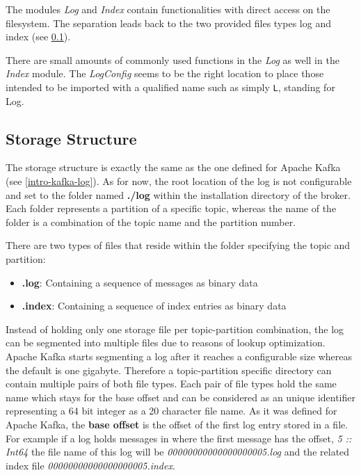 The modules \textit{Log} and \textit{Index} contain functionalities with direct
access on the filesystem. The separation leads back to the two provided files types
log and index (see \ref{log-broker-storage}).

There are small amounts of commonly used functions in the \textit{Log} as well
in the \textit{Index} module. The \textit{LogConfig} seems to be the right
location to place those intended to be imported with a qualified name such as
simply \lstinline{L}, standing for Log.

\subsection{Storage Structure}
\label{log-broker-storage}

The storage structure is exactly the same as the one defined for Apache Kafka (see
\ref{intro-kafka-log}).  As for now, the root location of the log is not
configurable and set to the folder named \textbf{./log} within the installation
directory of the broker. Each folder represents a partition of a specific topic,
whereas the name of the folder is a combination of the topic name and the
partition number.

There are two types of files that reside within the folder specifying the
topic and partition:
\begin{itemize}
    \item {\bf .log}: Containing a sequence of messages as binary data
    \item{\bf .index}: Containing a sequence of index entries as binary data
\end{itemize}

Instead of holding only one storage file per topic-partition combination, the
log can be segmented into multiple files due to reasons of lookup optimization.
Apache Kafka starts segmenting a log after it reaches a configurable size
whereas the default is one gigabyte. Therefore a topic-partition specific
directory can contain multiple pairs of both file types. Each pair of
file types hold the same name which stays for the base offset and can be
considered as an unique identifier representing a 64 bit integer as a 20
character file name. As it was defined for Apache Kafka, the \textbf{base
offset} is the offset of the first log entry stored in a file.  For example if
a log holds messages in where the first message has the offset, \textit{5 ::
Int64} the file name of this log will be \textit{00000000000000000005.log} and
the related index file \textit{00000000000000000005.index}.

